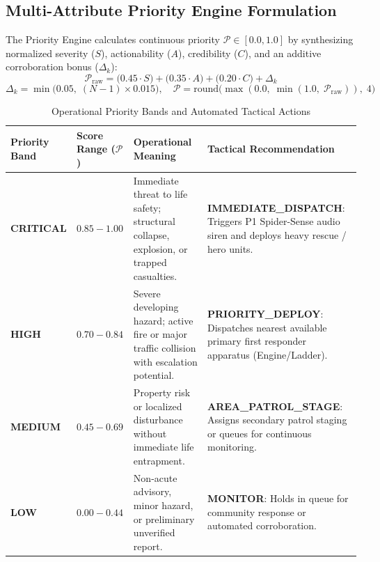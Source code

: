 \documentclass[10pt,a4paper]{article}
\begin{document}
\subsection{Multi-Attribute Priority Engine Formulation}
The Priority Engine calculates continuous priority $\mathcal{P} \in [0.0, 1.0]$ by synthesizing normalized severity ($S$), actionability ($A$), credibility ($C$), and an additive corroboration bonus ($\Delta_k$):
\begin{equation}
  \mathcal{P}_{\text{raw}} = \big(0.45 \cdot S\big) + \big(0.35 \cdot A\big) + \big(0.20 \cdot C\big) + \Delta_k
\end{equation}
\begin{equation}
  \Delta_k = \min\Big(0.05, \; (N - 1) \times 0.015\Big), \quad \mathcal{P} = \mathrm{round}\Big(\max\left(0.0, \; \min\left(1.0, \; \mathcal{P}_{\text{raw}}\right)\right), \; 4\Big)
\end{equation}

\begin{table}[htbp]
  \centering
  \small
  \caption{Operational Priority Bands and Automated Tactical Actions}
  \label{tab:priority_tiers}
  \begin{tabularx}{\textwidth}{lp{2.2cm}p{4.2cm}X}
    \toprule
    \textbf{Priority Band} & \textbf{Score Range ($\mathcal{P}$)} & \textbf{Operational Meaning} & \textbf{Tactical Recommendation} \\
    \midrule
    \color{CrimsonRed}\textbf{CRITICAL} & $0.85 - 1.00$ & Immediate threat to life safety; structural collapse, explosion, or trapped casualties. & \textbf{IMMEDIATE\_DISPATCH}: Triggers P1 Spider-Sense audio siren and deploys heavy rescue / hero units. \\
    \color{AmberYellow}\textbf{HIGH} & $0.70 - 0.84$ & Severe developing hazard; active fire or major traffic collision with escalation potential. & \textbf{PRIORITY\_DEPLOY}: Dispatches nearest available primary first responder apparatus (Engine/Ladder). \\
    \color{AccentBlue}\textbf{MEDIUM} & $0.45 - 0.69$ & Property risk or localized disturbance without immediate life entrapment. & \textbf{AREA\_PATROL\_STAGE}: Assigns secondary patrol staging or queues for continuous monitoring. \\
    \color{SlateBlue}\textbf{LOW} & $0.00 - 0.44$ & Non-acute advisory, minor hazard, or preliminary unverified report. & \textbf{MONITOR}: Holds in queue for community response or automated corroboration. \\
    \bottomrule
  \end{tabularx}
\end{table}
\end{document}
